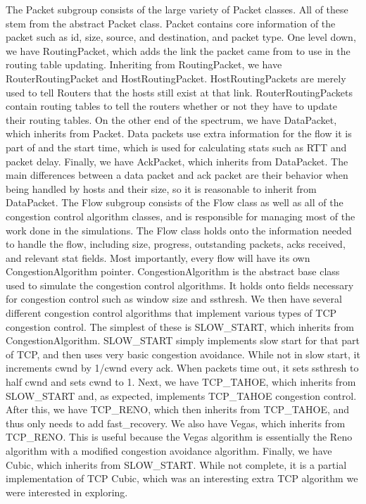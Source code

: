 \documentclass{article}
\begin{document}
    The Packet subgroup consists of the large variety of Packet classes. All of these stem from the abstract Packet class. Packet contains core information of the packet such as id, size, source, and destination, and packet type. One level down, we have RoutingPacket, which adds the link the packet came from to use in the routing table updating. Inheriting from RoutingPacket, we have RouterRoutingPacket and HostRoutingPacket. HostRoutingPackets are merely used to tell Routers that the hosts still exist at that link. RouterRoutingPackets contain routing tables to tell the routers whether or not they have to update their routing tables. On the other end of the spectrum, we have DataPacket, which inherits from Packet. Data packets use extra information for the flow it is part of and the start time, which is used for calculating stats such as RTT and packet delay. Finally, we have AckPacket, which inherits from DataPacket. The main differences between a data packet and ack packet are their behavior when being handled by hosts and their size, so it is reasonable to inherit from DataPacket.
    The Flow subgroup consists of the Flow class as well as all of the congestion control algorithm classes, and is responsible for managing most of the work done in the simulations. The Flow class holds onto the information needed to handle the flow, including size, progress, outstanding packets, acks received, and relevant stat fields. Most importantly, every flow will have its own CongestionAlgorithm pointer. CongestionAlgorithm is the abstract base class used to simulate the congestion control algorithms. It holds onto fields necessary for congestion control such as window size and ssthresh. We then have several different congestion control algorithms that implement various types of TCP congestion control. The simplest of these is SLOW_START, which inherits from CongestionAlgorithm. SLOW_START simply implements slow start for that part of TCP, and then uses very basic congestion avoidance. While not in slow start, it increments cwnd by 1/cwnd every ack. When packets time out, it sets ssthresh to half cwnd and sets cwnd to 1. Next, we have TCP_TAHOE, which inherits from SLOW_START and, as expected, implements TCP_TAHOE congestion control. After this, we have TCP_RENO, which then inherits from TCP_TAHOE, and thus only needs to add fast_recovery. We also have Vegas, which inherits from TCP_RENO. This is useful because the Vegas algorithm is essentially the Reno algorithm with a modified congestion avoidance algorithm. Finally, we have Cubic, which inherits from SLOW_START. While not complete, it is a partial implementation of TCP Cubic, which was an interesting extra TCP algorithm we were interested in exploring.
\end{document}
